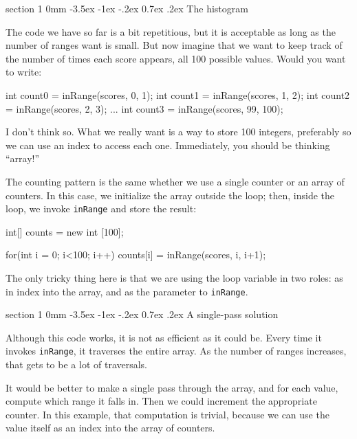 \documentclass{book}
\makeatletter
\renewcommand{\section}{\@startsection 
    {section} {1} {0mm}%
    {-3.5ex \@plus -1ex \@minus -.2ex}%
    {0.7ex \@plus.2ex}%
    {\normalfont\Large\bfseries}}
\makeatother
\begin{document}
\section{The histogram}

The code we have so far is a bit repetitious, but it is acceptable as
long as the number of ranges want is small.  But now imagine that
we want to keep track of the number of times each score appears,
all 100 possible values.  Would you want to write:

\begin{verbatimtab}
int count0 = inRange(scores, 0, 1);
int count1 = inRange(scores, 1, 2);
int count2 = inRange(scores, 2, 3);
...
int count3 = inRange(scores, 99, 100);
\end{verbatimtab}

I don't think so.  What we really want is a
way to store 100 integers, preferably
so we can use an index to access each one.  Immediately,
you should be thinking ``array!''

The counting pattern is the same whether we use a single counter or an
array of counters.  In this case, we initialize the array outside the
loop; then, inside the loop, we invoke {\tt inRange} and store the
result:

\begin{verbatimtab}
    int[] counts = new int [100];

    for(int i = 0; i<100; i++) {
        counts[i] = inRange(scores, i, i+1);
    }
\end{verbatimtab}
%
The only tricky thing here is that we are using the loop variable
in two roles: as in index into the array, and as the parameter to
{\tt inRange}.


\section{A single-pass solution}

Although this code works, it is not as efficient as it could
be.  Every time it invokes {\tt inRange}, it traverses the
entire array.  As the number of ranges increases, that gets
to be a lot of traversals.

It would be better to make a single pass through the array,
and for each value, compute which range it falls in.  Then
we could increment the appropriate counter.
In this example, that computation is trivial, because we
can use the value itself as an index into the array of counters.
\end{document}
